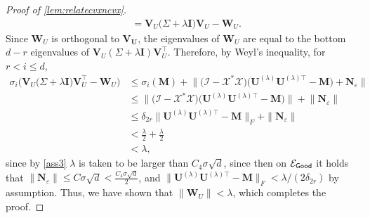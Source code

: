\documentclass[10pt,a4paper]{amsart}
\newcommand{\eps}{\ensuremath{\varepsilon}}
\newcommand{\s}{^*}
\renewcommand{\t}{^{\top}}
\begin{document}
\begin{proof}[Proof of \cref{lem:relatecvxncvx}]
\begin{align}
    &= \bm{V}_{U} \bigg( \Sigma + \lambda \bm{I} \bigg) \bm{V}_U - \bm{W}_U.  
\end{align}
Since $\bm{W}_U$ is orthogonal to $\bm{V}_{\bm{U}}$, the eigenvalues of $\bm{W}_U$ are equal to the bottom $d - r$ eigenvalues of $\bm{V}_U(\Sigma + \lambda \bm{I}) \bm{V}_U\t$. 
Therefore, by Weyl's inequality, for $r < i \leq d$,
\begin{align}
    \sigma_i \bigg( \bm{V}_{U} \bigg( \Sigma + \lambda \bm{I} \bigg) \bm{V}_U\t - \bm{W}_U \bigg) &\leq \sigma_i(\bm{M}) + \bigg\| \bigg( \mathcal{I} - \mathcal{X}\s \mathcal{X}  \bigg) \big( \bm{U}^{(\lambda)}\bm{U}^{(\lambda)\top} - \bm{M}  \big) + \bm{N}_{\eps} \bigg\| \\
    &\leq \bigg\|  \bigg( \mathcal{I} - \mathcal{X}\s \mathcal{X}  \bigg) \big( \bm{U}^{(\lambda)}\bm{U}^{(\lambda)\top} - \bm{M}  \big) \bigg\| + \bigg\| \bm{N}_{\eps} \bigg\| \\
    &\leq  \delta_{2r} \| \bm{U}^{(\lambda)}\bm{U}^{(\lambda)\top} - \bm{M} \|_F + \| \bm{N}_{\eps} \| \\
    &< \frac{\lambda}{2} + \frac{\lambda}{2} \\
    &< \lambda,
\end{align}
since by \cref{ass3} $\lambda$ is taken to be  larger than $C_4 \sigma \sqrt{d}$, since then on $\mathcal{E}_{{\sf Good}}$ it holds that $\|\bm{N}_{\eps}\| \leq C\sigma \sqrt{d} < \frac{C_4 \sigma \sqrt{d}}{2}$, and  $ \| \bm{U}^{(\lambda)}\bm{U}^{(\lambda)\top} - \bm{M} \|_F < \lambda/(2\delta_{2r})$ by  assumption.  Thus, we have shown that $\| \bm{W}_U\| < \lambda$, which completes the proof.
\end{proof}
\end{document}

